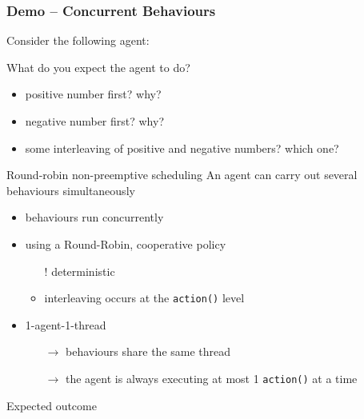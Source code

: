 \documentclass{beamer}\mode<presentation>{\usetheme{AMSCesenaPurpleAndGold}}
\begin{document}
\begin{frame}[allowframebreaks]
    \frametitle{Demo \currentDemo{} -- Concurrent Behaviours}

    Consider the following agent:
    

    \bigskip

    What do you expect the agent to do?
    \begin{itemize}
        \item positive number first? why?
        \item negative number first? why?
        \item some \alert{interleaving} of positive and negative numbers? which one?
    \end{itemize}

    \framebreak

    \begin{block}{Round-robin non-preemptive scheduling}
        An agent can carry out \alert{several} behaviours \alert{simultaneously}
        \begin{itemize}
            \item behaviours run concurrently

            \item using a \alert{Round-Robin}, cooperative policy
            \begin{itemize}
                \item[!] deterministic
                \item interleaving occurs at the \texttt{action()} level
            \end{itemize}

            \item 1-agent-1-thread
            \begin{itemize}
                \item[$\rightarrow$] behaviours share the same thread
                \item[$\rightarrow$] the agent is always executing at most 1 \texttt{action()} at a time
            \end{itemize}
        \end{itemize}
    \end{block}

    \framebreak

    Expected outcome
    


\end{frame}
\end{document}

